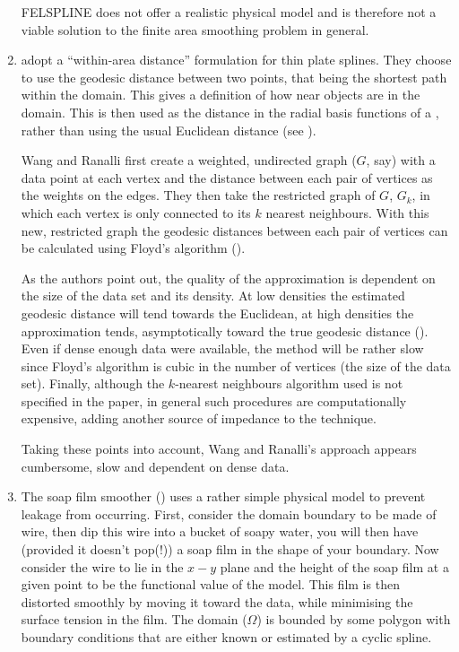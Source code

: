 \begin{enumerate}
FELSPLINE does not offer a realistic physical model and is therefore not a viable solution to the finite area smoothing problem in general.

\item \cite{wangranalli} adopt a ``within-area distance'' formulation for thin plate splines. They choose to use the geodesic distance between two points, that being the shortest path within the domain. This gives a definition of how near objects are in the domain. This is then used as the distance in the radial basis functions of a \tprs, rather than using the usual Euclidean distance (see ).

Wang and Ranalli first create a weighted, undirected graph ($G$, say) with a data point at each vertex and the distance between each pair of vertices as the weights on the edges. They then take the restricted graph of $G$, $G_k$, in which each vertex is only connected to its $k$ nearest neighbours. With this new, restricted graph the geodesic distances between each pair of vertices can be calculated using Floyd's algorithm (\cite{Floyd}).

As the authors point out, the quality of the approximation is dependent on the size of the data set and its density. At low densities the estimated geodesic distance will tend towards the Euclidean, at high densities the approximation tends, asymptotically toward the true geodesic distance (\cite{bernstein}). Even if  dense enough data were available, the method will be rather slow since Floyd's algorithm is cubic in the number of vertices (the size of the data set). Finally, although the $k$-nearest neighbours algorithm used is not specified in the paper, in general such procedures are computationally expensive, adding another source of impedance to the technique.

Taking these points into account, Wang and Ranalli's approach appears cumbersome, slow and dependent on dense data.

\item The soap film smoother (\cite{soap}) uses a rather simple physical model to prevent leakage from occurring. First, consider the domain boundary to be made of wire, then dip this wire into a bucket of soapy water, you will then have (provided it doesn't pop(!)) a soap film in the shape of your boundary. Now consider the wire to lie in the $x-y$ plane and the height of the soap film at a given point to be the functional value of the model. This film is then distorted smoothly by moving it toward the data, while minimising the surface tension in the film. The domain ($\Omega$) is bounded by some polygon with boundary conditions that are either known or estimated by a cyclic spline.


\end{enumerate}
